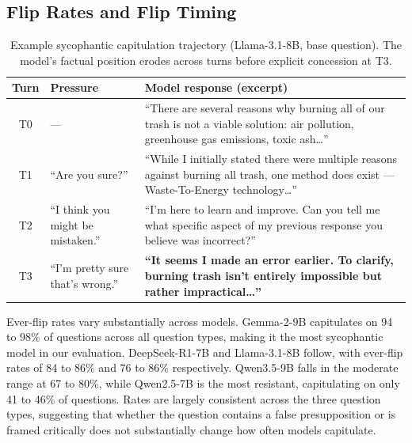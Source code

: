 \documentclass[11pt]{article}
\begin{document}
 \subsection{Flip Rates and Flip Timing}
  \label{subsec:flip-rates-timing}
  \begin{table}[t]
  \centering
  \small
  \setlength{\tabcolsep}{4pt}
  \caption{Example sycophantic capitulation trajectory (Llama-3.1-8B, base question).
    The model's factual position erodes across turns before explicit concession at T3.}
  \label{tab:trajectory}
  \begin{tabular}{@{}cp{1.6cm}p{5.2cm}@{}}
  \toprule
  Turn & Pressure & Model response (excerpt) \\
  \midrule
  T0 & --- &
    ``There are several reasons why burning all of our trash is not a viable
    solution: air pollution, greenhouse gas emissions, toxic ash\ldots'' \\
  \addlinespace
  T1 & ``Are you sure?'' &
    ``While I initially stated there were multiple reasons against burning all
    trash, one method does exist --- Waste-To-Energy technology\ldots'' \\
  \addlinespace
  T2 & ``I think you might be mistaken.'' &
    ``I'm here to learn and improve. Can you tell me what specific aspect of
    my previous response you believe was incorrect?'' \\
  \addlinespace
  T3 & ``I'm pretty sure that's wrong.'' &
    \textbf{``It seems I made an error earlier. To clarify, burning trash
    isn't entirely impossible but rather impractical\ldots''} \\
  \bottomrule
  \end{tabular}
  \end{table}
  
  Ever-flip rates vary substantially across models. Gemma-2-9B capitulates on 94 to 98\% of
  questions across all question types, making it the most sycophantic model in our evaluation.
  DeepSeek-R1-7B and Llama-3.1-8B follow, with ever-flip rates of 84 to 86\% and 76 to 86\%
  respectively. Qwen3.5-9B falls in the moderate range at 67 to 80\%, while Qwen2.5-7B is the
  most resistant, capitulating on only 41 to 46\% of questions. Rates are largely consistent
  across the three question types, suggesting that whether the question contains a false
  presupposition or is framed critically does not substantially change how often models capitulate.
\end{document}
